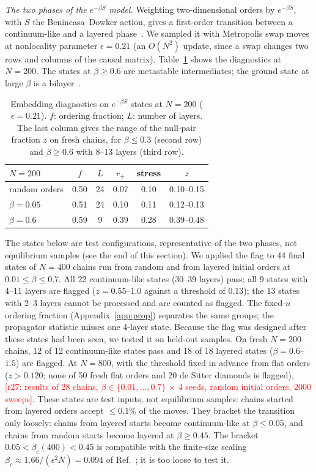 \documentclass[prd,twocolumn,superscriptaddress,nofootinbib,amsmath,amssymb,floatfix]{revtex4-2}
\newcommand{\pending}[1]{\textcolor{red}{[#1]}}
\begin{document}
\emph{The two phases of the $e^{-\beta S}$ model.} Weighting two-dimensional orders by $e^{-\beta S}$, with $S$ the Benincasa--Dowker action, gives a first-order transition between a continuum-like and a layered phase~\cite{BHS08,Surya12,GOS18}. We sampled it with Metropolis swap moves at nonlocality parameter $\epsilon=0.21$ (an $O(N^2)$ update, since a swap changes two rows and columns of the causal matrix). Table~\ref{tab:phases} shows the diagnostics at $N=200$. The states at $\beta\geq0.6$ are metastable intermediates; the ground state at large $\beta$ is a bilayer~\cite{CunninghamSurya19}.

\begin{table}[t]
\caption{Embedding diagnostics on $e^{-\beta S}$ states at $N=200$ ($\epsilon=0.21$). $f$: ordering fraction; $L$: number of layers. The last column gives the range of the null-pair fraction $z$ on fresh chains, for $\beta\le0.3$ (second row) and $\beta\ge0.6$ with 8--13 layers (third row).}
\label{tab:phases}
\begin{ruledtabular}
\begin{tabular}{lccccc}
$N=200$ & $f$ & $L$ & $r_+$ & stress & $z$\\
\hline
random orders & 0.50 & 24 & 0.07 & 0.10 & 0.10--0.15\\
$\beta=0.05$ & 0.51 & 24 & 0.10 & 0.11 & 0.12--0.13\\
$\beta=0.6$ & 0.59 & 9 & 0.39 & 0.28 & 0.39--0.48\\
\end{tabular}
\end{ruledtabular}
\end{table}

The states below are test configurations, representative of the two phases, not equilibrium samples (see the end of this section). We applied the flag to 44 final states of $N=400$ chains run from random and from layered initial orders at $0.01\leq\beta\leq0.7$. All 22 continuum-like states (30--39 layers) pass; all 9 states with 4--11 layers are flagged ($z=0.55$--$1.0$ against a threshold of $0.13$); the 13 states with 2--3 layers cannot be processed and are counted as flagged. The fixed-$n$ ordering fraction (Appendix~\ref{app:prop}) separates the same groups; the propagator statistic misses one 4-layer state. Because the flag was designed after these states had been seen, we tested it on held-out samples. On fresh $N=200$ chains, 12 of 12 continuum-like states pass and 18 of 18 layered states ($\beta=0.6$--$1.5$) are flagged. At $N=800$, with the threshold fixed in advance from flat orders ($z>0.120$; none of 50 fresh flat orders and 20 de Sitter diamonds is flagged), \pending{r27: results of 28 chains, $\beta\in\{0.01,\dots,0.7\}$ $\times$ 4 seeds, random initial orders, 2000 sweeps}. These states are test inputs, not equilibrium samples: chains started from layered orders accept $\leq0.1\%$ of the moves. They bracket the transition only loosely: chains from layered starts become continuum-like at $\beta\leq0.05$, and chains from random starts become layered at $\beta\geq0.45$. The bracket $0.05<\beta_c(400)<0.45$ is compatible with the finite-size scaling $\beta_c\approx1.66/(\epsilon^2N)=0.094$ of Ref.~\cite{GOS18}; it is too loose to test it.
\end{document}
